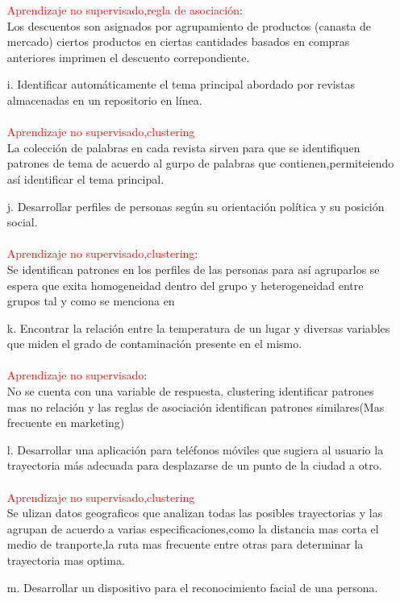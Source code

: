 \documentclass[9pt,letterpaper]{article}\usepackage[]{graphicx}\usepackage[]{color}
\begin{document}
\begin{enumerate}
\textcolor{red}{Aprendizaje no supervisado,regla de asociación}: \\
Los descuentos son asignados por agrupamiento de productos (canasta de mercado) ciertos productos en ciertas cantidades basados en compras anteriores imprimen el descuento correpondiente.
 \item[i.] Identificar automáticamente el tema principal abordado por revistas almacenadas en un
repositorio en línea.
\\ \\
\textcolor{red}{Aprendizaje no supervisado,clustering}\\
La colección de palabras en cada revista sirven para que se identifiquen patrones de tema de acuerdo al gurpo de palabras que contienen,permiteiendo así identificar el tema principal.
        \item[j.] Desarrollar perfiles de personas según su orientación política y su posición social.
        \\ \\
\textcolor{red}{Aprendizaje no supervisado,clustering}:\\ Se identifican patrones en los perfiles de las personas para así agruparlos se espera que exita homogeneidad dentro del grupo y heterogeneidad entre grupos tal y como se menciona en \cite{timaran_pereira_descubrimiento_2016}
    \item[k.] Encontrar la relación entre la temperatura de un lugar y diversas variables que miden el grado de
contaminación presente en el mismo.
\\ \\
\textcolor{red}{Aprendizaje no supervisado}: \\ No se cuenta con una variable de respuesta, clustering identificar patrones mas no relación y las reglas de asociación identifican patrones similares(Mas frecuente en marketing)
        \item[l.] Desarrollar una aplicación para teléfonos móviles que sugiera al usuario la trayectoria más
adecuada para desplazarse de un punto de la ciudad a otro.
\\ \\
\textcolor{red}{Aprendizaje no supervisado,clustering}\\
Se ulizan datos geograficos que analizan todas las posibles trayectorias y las agrupan de acuerdo a varias especificaciones,como la distancia mas corta el medio de tranporte,la ruta mas frecuente entre otras para determinar la trayectoria mas optima.
            \item[m.] Desarrollar un dispositivo para el reconocimiento facial de una persona.

\end{enumerate}
\end{document}
